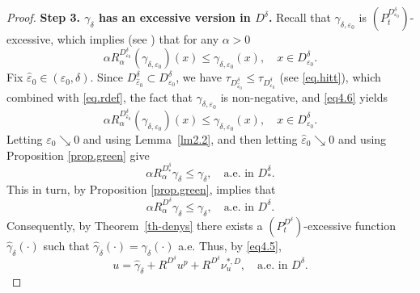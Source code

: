 \documentclass[11pt,a4paper,reqno]{amsart}
\theoremstyle{definition}
\numberwithin{equation}{section}
\begin{document}
\begin{proof}
\medskip 
\noindent 
\textbf{Step 3. $\gamma_\delta$ has an excessive version in $D^\delta$.} 
Recall that $\gamma_{\delta,\varepsilon_0}$ is $(P_t^{D_{\varepsilon_0}^\delta})$-excessive, 
which implies (see \cite[Proposition II.2.3]{BG}) that  for any $\alpha>0$
\begin{equation}
\label{eq4.6}
\alpha R^{D_{\varepsilon_0}^\delta}_\alpha (\gamma_{\delta,\varepsilon_0})(x)\le \gamma_{\delta,\varepsilon_0}(x),\quad x\in D_{\varepsilon_0}^\delta.
\end{equation}
Fix $\hat\varepsilon_0\in (\varepsilon_0,\delta)$. Since $D_{\hat \varepsilon_0}^\delta\subset D_{\varepsilon_0}^\delta$, we have
$\tau_{D_{\hat \varepsilon_0}^\delta}\le \tau_{D_{\varepsilon_0}^\delta}$ (see \eqref{eq.hitt}), which combined with \eqref{eq.rdef}, the fact that  $\gamma_{\delta,\varepsilon_0}$
is non-negative, and \eqref{eq4.6} yields
\[
\alpha R^{D_{\hat \varepsilon_0}^\delta}_\alpha (\gamma_{\delta,\varepsilon_0})(x)\le \gamma_{\delta,\varepsilon_0}(x),\quad x\in D_{\varepsilon_0}^\delta.
\]
Letting $\varepsilon_0\searrow 0$ and using Lemma~\ref{lm2.2}, and then letting 
$\hat \varepsilon_0\searrow 0$ and using Proposition  \ref{prop.green}  give
\[
\alpha R^{D^\delta_*}_\alpha\gamma_\delta\le \gamma_\delta,\quad \text{a.e. in } D^\delta_*.
\]
This in turn, by Proposition  \ref{prop.green}, implies that 
\[
\alpha R^{D^\delta}_\alpha\gamma_\delta\le \gamma_\delta,\quad \text{a.e. in } D^\delta.
\]
Consequently, by Theorem~\ref{th-denys} there exists a $(P^{D^\delta}_t)$-excessive function $\hat \gamma_\delta(\cdot)$ such that 
$\hat \gamma_\delta(\cdot)= \gamma_\delta(\cdot)$ a.e. Thus, by \eqref{eq4.5}, 
\begin{equation}
\label{eq.now1}
 u=\hat \gamma_\delta+R^{D^\delta}u^p+R^{D^\delta}\nu^{*,D}_{u},\quad \text{a.e. in }D^\delta.
\end{equation}


\end{proof}
\end{document}
